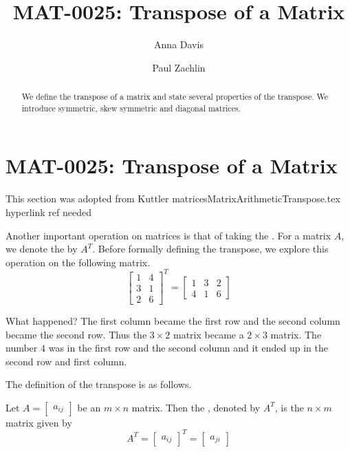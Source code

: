 \documentclass{ximera}
\author{Anna Davis \and Paul Zachlin} \title{MAT-0025:  Transpose of a Matrix} \license{CC-BY 4.0}
\begin{document}
\begin{abstract}
  We define the transpose of a matrix and state several properties of the transpose.  We introduce symmetric, skew symmetric and diagonal matrices.
\end{abstract}
\maketitle



\section*{MAT-0025:  Transpose of a Matrix}


{\color{red} This section was adopted from Kuttler matricesMatrixArithmeticTranspose.tex hyperlink ref needed}

Another important operation on matrices is that of taking the . For a matrix $A$, we denote the
 by $A^T$. Before formally defining the transpose, we explore this
operation on the following matrix.
\begin{equation*}
\begin{bmatrix}
1 & 4 \\
3 & 1 \\
2 & 6
\end{bmatrix}^{T}=
\begin{bmatrix}
1 & 3 & 2 \\
4 & 1 & 6
\end{bmatrix}
\end{equation*}

What happened? The first column became the first row and the second column
became the second row. Thus the $3\times 2$ matrix became a $2\times 3$
matrix. The number $4$ was in the first row and the second column and it
ended up in the second row and first column. 

The definition of the transpose is as follows.

\begin{definition}\label{def:matrixtranspose}
Let $A=\begin{bmatrix} a _{ij}\end{bmatrix}$ be an $m\times n$ matrix. Then the , denoted by $A^{T}$, is the $n\times m$
matrix given by 
\begin{equation*}
A^{T} = \begin{bmatrix} a _{ij}\end{bmatrix}^{T}= \begin{bmatrix} a_{ji} \end{bmatrix}
\end{equation*}
\end{definition}
\end{document}
